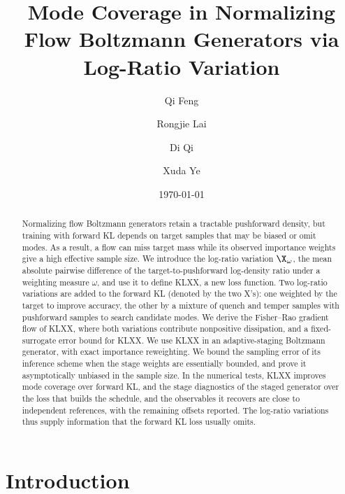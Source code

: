 \documentclass{article}
\title{Mode Coverage in Normalizing Flow Boltzmann Generators via Log-Ratio Variation}
\author[1]{Qi Feng}
\author[2]{Rongjie Lai}
\author[2]{Di Qi}
\author[2]{Xuda Ye}
\affil[1]{Department of Mathematics, Florida State University, Tallahassee, FL 32306}
\affil[2]{Department of Mathematics, Purdue University, West Lafayette, IN 47907}
\date{\today}
\begin{document}
\maketitle

\begin{abstract}
Normalizing flow Boltzmann generators retain a tractable pushforward density, but training with forward KL depends on target samples that may be biased or omit modes. As a result, a flow can miss target mass while its observed importance weights give a high effective sample size. We introduce the log-ratio variation $\X_\omega$, the mean absolute pairwise difference of the target-to-pushforward log-density ratio under a weighting measure $\omega$, and use it to define KLXX, a new loss function. Two log-ratio variations are added to the forward KL (denoted by the two X's): one weighted by the target to improve accuracy, the other by a mixture of quench and temper samples with pushforward samples to search candidate modes. We derive the Fisher--Rao gradient flow of KLXX, where both variations contribute nonpositive dissipation, and a fixed-surrogate error bound for KLXX. We use KLXX in an adaptive-staging Boltzmann generator, with exact importance reweighting. We bound the sampling error of its inference scheme when the stage weights are essentially bounded, and prove it asymptotically unbiased in the sample size. In the numerical tests, KLXX improves mode coverage over forward KL, and the stage diagnostics of the staged generator over the loss that builds the schedule, and the observables it recovers are close to independent references, with the remaining offsets reported. The log-ratio variations thus supply information that the forward KL loss usually omits.
\end{abstract}

\par\medskip
\noindent{}
\par\medskip

\section{Introduction}
\label{sec: intro}
\end{document}
